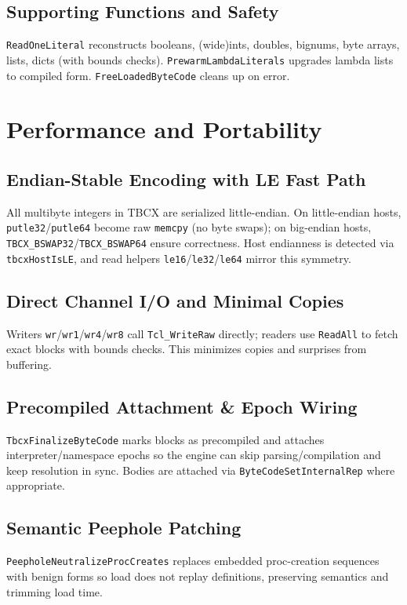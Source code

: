 \documentclass[11pt,a4paper]{article}
\begin{document}
\subsection{Supporting Functions and Safety}
\texttt{ReadOneLiteral} reconstructs booleans, (wide)ints, doubles, bignums, byte arrays, lists, dicts (with bounds checks). \texttt{PrewarmLambdaLiterals} upgrades lambda lists to compiled form. \texttt{FreeLoadedByteCode} cleans up on error.

\section{Performance and Portability}
\subsection{Endian-Stable Encoding with LE Fast Path}
All multibyte integers in TBCX are serialized little-endian. On little-endian hosts, \texttt{putle32}/\texttt{putle64} become raw \texttt{memcpy} (no byte swaps); on big-endian hosts, \texttt{TBCX\_BSWAP32}/\texttt{TBCX\_BSWAP64} ensure correctness. Host endianness is detected via \texttt{tbcxHostIsLE}, and read helpers \texttt{le16}/\texttt{le32}/\texttt{le64} mirror this symmetry.

\subsection{Direct Channel I/O and Minimal Copies}
Writers \texttt{wr}/\texttt{wr1}/\texttt{wr4}/\texttt{wr8} call \texttt{Tcl\_WriteRaw} directly; readers use \texttt{ReadAll} to fetch exact blocks with bounds checks. This minimizes copies and surprises from buffering.

\subsection{Precompiled Attachment \& Epoch Wiring}
\texttt{TbcxFinalizeByteCode} marks blocks as precompiled and attaches interpreter/namespace epochs so the engine can skip parsing/compilation and keep resolution in sync. Bodies are attached via \texttt{ByteCodeSetInternalRep} where appropriate.

\subsection{Semantic Peephole Patching}
\texttt{PeepholeNeutralizeProcCreates} replaces embedded proc-creation sequences with benign forms so load does not replay definitions, preserving semantics and trimming load time.
\end{document}

